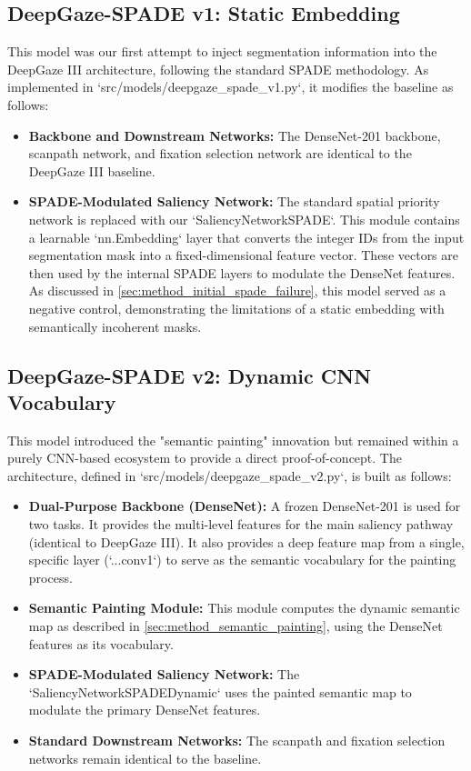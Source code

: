 \subsection{DeepGaze-SPADE v1: Static Embedding}
This model was our first attempt to inject segmentation information into the DeepGaze III architecture, following the standard SPADE methodology. As implemented in `src/models/deepgaze\_spade\_v1.py`, it modifies the baseline as follows:

\begin{itemize}
    \item \textbf{Backbone and Downstream Networks:} The DenseNet-201 backbone, scanpath network, and fixation selection network are identical to the DeepGaze III baseline.
    \item \textbf{SPADE-Modulated Saliency Network:} The standard spatial priority network is replaced with our `SaliencyNetworkSPADE`. This module contains a learnable `nn.Embedding` layer that converts the integer IDs from the input segmentation mask into a fixed-dimensional feature vector. These vectors are then used by the internal SPADE layers to modulate the DenseNet features. As discussed in \cref{sec:method_initial_spade_failure}, this model served as a negative control, demonstrating the limitations of a static embedding with semantically incoherent masks.
\end{itemize}

\subsection{DeepGaze-SPADE v2: Dynamic CNN Vocabulary}
This model introduced the "semantic painting" innovation but remained within a purely CNN-based ecosystem to provide a direct proof-of-concept. The architecture, defined in `src/models/deepgaze\_spade\_v2.py`, is built as follows:

\begin{itemize}
    \item \textbf{Dual-Purpose Backbone (DenseNet):} A frozen DenseNet-201 is used for two tasks. It provides the multi-level features for the main saliency pathway (identical to DeepGaze III). It also provides a deep feature map from a single, specific layer (`...conv1`) to serve as the semantic vocabulary for the painting process.
    \item \textbf{Semantic Painting Module:} This module computes the dynamic semantic map as described in \cref{sec:method_semantic_painting}, using the DenseNet features as its vocabulary.
    \item \textbf{SPADE-Modulated Saliency Network:} The `SaliencyNetworkSPADEDynamic` uses the painted semantic map to modulate the primary DenseNet features.
    \item \textbf{Standard Downstream Networks:} The scanpath and fixation selection networks remain identical to the baseline.
\end{itemize}

